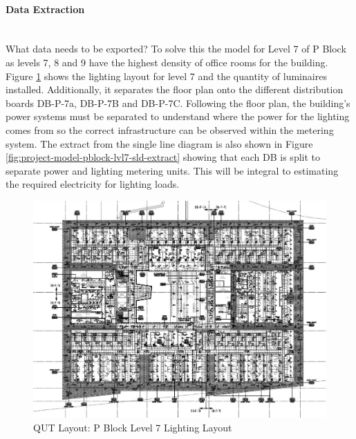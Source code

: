 \paragraph{Data Extraction}
~~\\
What data needs to be exported? To solve this the model for Level 7 of P Block as levels 7, 8 and 9 have the highest density of office rooms for the building. Figure \ref{fig:project-model-pblock-lvl7} shows the lighting layout for level 7 and the quantity of luminaires installed. Additionally, it separates the floor plan onto the different distribution boards DB-P-7a, DB-P-7B and DB-P-7C. Following the floor plan, the building's power systems must be separated to understand where the power for the lighting comes from so the correct infrastructure can be observed within the metering system. The extract from the single line diagram is also shown in Figure \ref{fig:project-model-pblock-lvl7-sld-extract} showing that each DB is split to separate power and lighting metering units. This will be integral to estimating the required electricity for lighting loads.      

\begin{figure}[H]
	\hfill\includegraphics[width = 120mm]{images/project-model/qut-lvl7-lighting}\hspace*{\fill}
	\caption{QUT Layout: P Block Level 7 Lighting Layout} 
	\label{fig:project-model-pblock-lvl7}
\end{figure}

